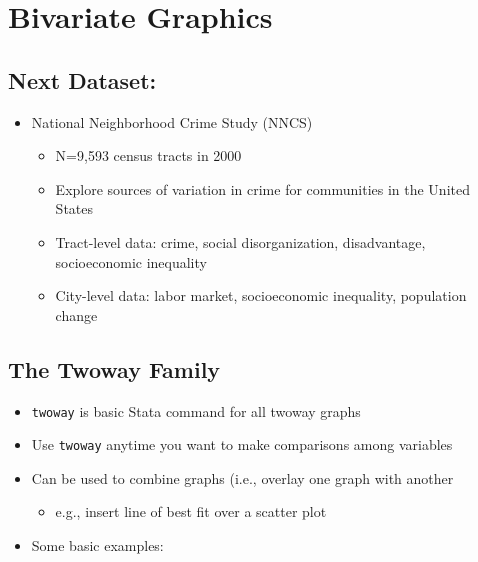 \documentclass[]{book}
\providecommand{\tightlist}{%
  \setlength{\itemsep}{0pt}\setlength{\parskip}{0pt}}
\begin{document}
\hypertarget{bivariate-graphics}{%
\section{Bivariate Graphics}\label{bivariate-graphics}}

\hypertarget{next-dataset}{%
\subsection{Next Dataset:}\label{next-dataset}}

\begin{itemize}
\tightlist
\item
  National Neighborhood Crime Study (NNCS)

  \begin{itemize}
  \tightlist
  \item
    N=9,593 census tracts in 2000
  \item
    Explore sources of variation in crime for communities in the United States
  \item
    Tract-level data: crime, social disorganization, disadvantage, socioeconomic inequality
  \item
    City-level data: labor market, socioeconomic inequality, population change
  \end{itemize}
\end{itemize}

\hypertarget{the-twoway-family}{%
\subsection{The Twoway Family}\label{the-twoway-family}}

\begin{itemize}
\tightlist
\item
  \texttt{twoway} is basic Stata command for all twoway graphs
\item
  Use \texttt{twoway} anytime you want to make comparisons among variables
\item
  Can be used to combine graphs (i.e., overlay one graph with another

  \begin{itemize}
  \tightlist
  \item
    e.g., insert line of best fit over a scatter plot
  \end{itemize}
\item
  Some basic examples:
\end{itemize}
\end{document}
